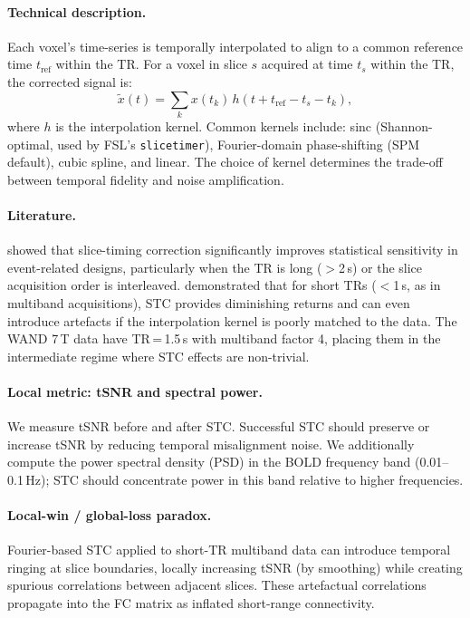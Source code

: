 \documentclass[11pt,a4paper]{article}
\begin{document}
\paragraph{Technical description.}
Each voxel's time-series is temporally interpolated to align to a common reference time $t_{\mathrm{ref}}$ within the TR.  For a voxel in slice $s$ acquired at time $t_s$ within the TR, the corrected signal is:
\begin{equation}
    \tilde{x}(t) = \sum_{k} x(t_k)\, h(t + t_{\mathrm{ref}} - t_s - t_k),
\end{equation}
where $h$ is the interpolation kernel.  Common kernels include: sinc (Shannon-optimal, used by FSL's \texttt{slicetimer}), Fourier-domain phase-shifting (SPM default), cubic spline, and linear.  The choice of kernel determines the trade-off between temporal fidelity and noise amplification.

\paragraph{Literature.}
\citet{sladky2011} showed that slice-timing correction significantly improves statistical sensitivity in event-related designs, particularly when the TR is long ($>$2\,s) or the slice acquisition order is interleaved.  \citet{parker2017} demonstrated that for short TRs ($<$1\,s, as in multiband acquisitions), STC provides diminishing returns and can even introduce artefacts if the interpolation kernel is poorly matched to the data.  The WAND 7\,T data have TR\,=\,1.5\,s with multiband factor 4, placing them in the intermediate regime where STC effects are non-trivial.

\paragraph{Local metric: tSNR and spectral power.}
We measure tSNR before and after STC.  Successful STC should preserve or increase tSNR by reducing temporal misalignment noise.  We additionally compute the power spectral density (PSD) in the BOLD frequency band (0.01--0.1\,Hz); STC should concentrate power in this band relative to higher frequencies.

\paragraph{Local-win / global-loss paradox.}
Fourier-based STC applied to short-TR multiband data can introduce temporal ringing at slice boundaries, locally increasing tSNR (by smoothing) while creating spurious correlations between adjacent slices.  These artefactual correlations propagate into the FC matrix as inflated short-range connectivity.
\end{document}
